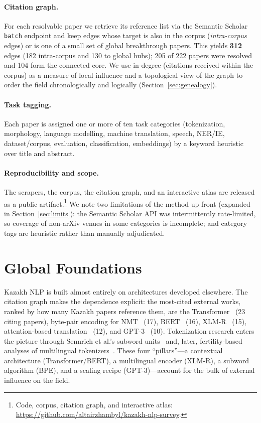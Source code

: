 \documentclass{article}
\begin{document}
\paragraph{Citation graph.}
For each resolvable paper we retrieve its reference list via the Semantic Scholar
\texttt{batch} endpoint and keep edges whose target is also in the corpus
(\emph{intra-corpus} edges) or is one of a small set of global breakthrough papers.
This yields \textbf{312} edges (182 intra-corpus and 130 to global hubs); 205 of 222
papers were resolved and 104 form the connected core. We use in-degree (citations
received within the corpus) as a measure of local influence and a topological view of
the graph to order the field chronologically and logically
(Section~\ref{sec:genealogy}).

\paragraph{Task tagging.}
Each paper is assigned one or more of ten task categories (tokenization, morphology,
language modelling, machine translation, speech, NER/IE, dataset/corpus, evaluation,
classification, embeddings) by a keyword heuristic over title and abstract.

\paragraph{Reproducibility and scope.}
The scrapers, the corpus, the citation graph, and an interactive atlas are released as a
public artifact.\footnote{Code, corpus, citation graph, and interactive atlas:
\url{https://github.com/altairzhambyl/kazakh-nlp-survey}.}
We note two limitations of the method up front (expanded in Section~\ref{sec:limits}):
the Semantic Scholar API was intermittently rate-limited, so coverage of non-arXiv
venues in some categories is incomplete; and category tags are heuristic rather than
manually adjudicated.

\section{Global Foundations}
\label{sec:foundations}
Kazakh NLP is built almost entirely on architectures developed elsewhere. The citation
graph makes the dependence explicit: the most-cited external works, ranked by how many
Kazakh papers reference them, are the Transformer~\cite{transformer} (23 citing papers),
byte-pair encoding for NMT~\cite{bpe} (17), BERT~\cite{bert} (16), XLM-R~\cite{xlmr} (15),
attention-based translation~\cite{bahdanau} (12), and GPT-3~\cite{gpt3} (10). Tokenization
research enters the picture through Sennrich et al.'s subword units~\cite{bpe} and, later,
fertility-based analyses of multilingual tokenizers~\cite{rust}. These four
``pillars''---a contextual architecture (Transformer/BERT), a multilingual encoder
(XLM-R), a subword algorithm (BPE), and a scaling recipe (GPT-3)---account for the bulk of
external influence on the field.
\end{document}
